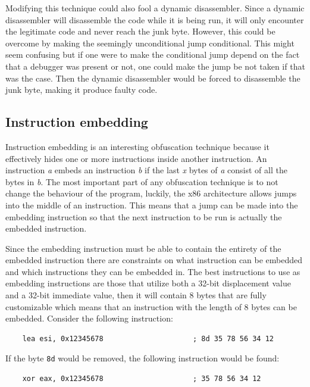 \documentclass[11pt,twoside]{eitExjobb}
\begin{document}
Modifying this technique could also fool a dynamic disassembler. Since a dynamic disassembler will disassemble the code while it is being run, it will only encounter the legitimate code and never reach the junk byte. However, this could be overcome by making the seemingly unconditional jump conditional. This might seem confusing but if one were to make the conditional jump depend on the fact that a debugger was present or not, one could make the jump be not taken if that was the case. Then the dynamic disassembler would be forced to disassemble the junk byte, making it produce faulty code.


\subsection{Instruction embedding}
Instruction embedding\cite{instructionembedding} is an interesting obfuscation technique because it effectively hides one or more instructions inside another instruction. An instruction \emph{a} embeds an instruction \emph{b} if the last \emph{x} bytes of \emph{a} consist of all the bytes in \emph{b}. The most important part of any obfuscation technique is to not change the behaviour of the program, luckily, the x86 architecture allows jumps into the middle of an instruction. This means that a jump can be made into the embedding instruction so that the next instruction to be run is actually the embedded instruction.

Since the embedding instruction must be able to contain the entirety of the embedded instruction there are constraints on what instruction can be embedded and which instructions they can be embedded in. The best instructions to use as embedding instructions are those that utilize both a 32-bit displacement value and a 32-bit immediate value, then it will contain 8 bytes that are fully customizable which means that an instruction with the length of 8 bytes can be embedded. Consider the following instruction:

\begin{verbatim}
    lea esi, 0x12345678                     ; 8d 35 78 56 34 12
\end{verbatim}

\noindent If the byte \texttt{8d} would be removed, the following instruction would be found:

\begin{verbatim}
    xor eax, 0x12345678                     ; 35 78 56 34 12
\end{verbatim}
\end{document}
